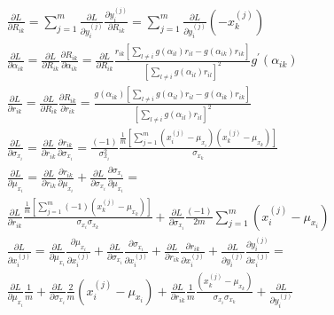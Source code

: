 \documentclass[oneside]{article}
\begin{document}
\begin{eqnarray}
\frac{\partial L}{\partial R_{ik}} = \sum_{j=1}^{m}\frac{\partial L}{\partial y_{i}^{(j)}}\frac{\partial y_{i}^{(j)}}{\partial R_{ik}}=\sum_{j=1}^{m}\frac{\partial L}{\partial y_{i}^{(j)}}(-x_{k}^{(j)}) \\
\frac{\partial L}{\partial \alpha_{ik}} = \frac{\partial L}{\partial R_{ik}}\frac{\partial R_{ik}}{\partial \alpha_{ik}}=\frac{\partial L}{\partial R_{ik}}\frac{r_{ik}[\sum_{l\neq i}g(\alpha_{il})r_{il} - g(\alpha_{ik})r_{ik}]}{[\sum_{l\neq i}g(\alpha_{il})r_{il}]^{2}}g^{\prime}(\alpha_{ik}) \\
\frac{\partial L}{\partial r_{ik}} = \frac{\partial L}{\partial R_{ik}}\frac{\partial R_{ik}}{\partial r_{ik}} = \frac{g(\alpha_{ik})[\sum_{l\neq i}g(\alpha_{il})r_{il} - g(\alpha_{ik})r_{ik}]}{[\sum_{l\neq i}g(\alpha_{il})r_{il}]^{2}} \\
\frac{\partial L}{\partial \sigma_{x_{i}}} = \frac{\partial L}{\partial r_{ik}}\frac{\partial r_{ik}}{\partial \sigma_{x_{i}}}=\frac{(-1)}{\sigma_{x_{i}}^{2}}\frac{\frac{1}{m}[\sum_{j=1}^{m}(x_{i}^{(j)} - \mu_{x_{i}})(x_{k}^{(j)} - \mu_{x_{k}})]}{\sigma_{x_{k}}} \\
\frac{\partial L}{\partial \mu_{x_{i}}} = \frac{\partial L}{\partial r_{ik}}\frac{\partial r_{ik}}{\partial \mu_{x_{i}}} + \frac{\partial L}{\partial \sigma_{x_{i}}}\frac{\partial \sigma_{x_{i}}}{\partial \mu_{x_{i}}} = \nonumber \\
\frac{\partial L}{\partial r_{ik}}\frac{\frac{1}{m}[\sum_{j=1}^{m}(-1)(x_{k}^{(j)} - \mu_{x_{k}})]}{\sigma_{x_{i}}\sigma_{x_{k}}} + \frac{\partial L}{\partial \sigma_{x_{i}}}\frac{(-1)}{2m}\sum_{j=1}^{m}(x_{i}^{(j)} - \mu_{x_{i}}) \\
\frac{\partial L}{\partial x_{i}^{(j)}} = \frac{\partial L}{\partial \mu_{x_{i}}}\frac{\partial \mu_{x_{i}}}{\partial x_{i}^{(j)}} + \frac{\partial L}{\partial \sigma_{x_{i}}}\frac{\partial \sigma_{x_{i}}}{\partial x_{i}^{(j)}} + \frac{\partial L}{\partial r_{ik}}\frac{\partial r_{ik}}{\partial x_{i}^{(j)}} + \frac{\partial L}{\partial y_{i}^{(j)}}\frac{\partial y_{i}^{(j)}}{\partial x_{i}^{(j)}} = \nonumber \\
 \frac{\partial L}{\partial \mu_{x_{i}}}\frac{1}{m}
+ \frac{\partial L}{\partial \sigma_{x_{i}}}\frac{2}{m}(x_{i}^{(j)} - \mu_{x_{i}})
+ \frac{\partial L}{\partial r_{ik}}\frac{1}{m}\frac{(x_{k}^{(j)} - \mu_{x_{k}})}{\sigma_{x_{i}}\sigma_{x_{k}}}
+ \frac{\partial L}{\partial y_{i}^{(j)}} 
\end{eqnarray}
\end{document}
